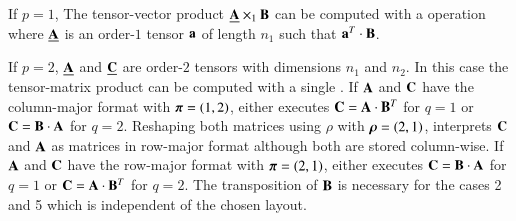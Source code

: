\begin{comment}
\midrule
8 & $>2$ & any & \ $\pi_2,..,\pi_{p-1}$ \ & \tf{gemm(rm)*} & - & $m$ & $n_{\pi_1}$ & $n_q$ & $\mbB$ & $n_q$ & $\mubA$ & $w_{q}$  & $w_{q}$ \\
  & $>2$ & any & \ $\pi_2,..,\pi_{p-1}$ \ & \tf{gemm(cm)*} & - & $n_{\pi_1}$ & $m$ & $n_q$ & $\mubA$ & $w_{q}$ & $\mbB$ & $n_q$ & $w_{q}$ \\
\bottomrule \\
\end{tabular}
\caption%
{%
\footnotesize
Eight cases with \tf{gemv} and \tf{gemm} for the mode-$q$ tensor-matrix multiplication.
Arguments \tf{T}, \tf{M}, \tf{N}, etc. of the BLAS are chosen with respect to the tensor order $p$, layout $\mbpi$ and contraction mode $q$ where \tf{T} specifies if $\mbB$ is transposed.
\tf{gemm*} denotes multiple \tf{gemm} calls with different tensor slices.
Argument $\bar{n}_q$ for case 6 and 7 is given by $\bar{n}_q = 1/n_q \prod_r^p n_r$.
Matrix $\mbB$ has the row-major format.
}
\label{tab:mapping_rm}
\end{table*}
\end{comment}



If $p=1$, The tensor-vector product $\underline{\mathbf{A}} \times_1 \mathbf{B}$ can be computed with a  operation where $\underline{\mathbf{A}}$ is an order-$1$ tensor $\mathbf{a}$ of length $n_1$ such that $\mathbf{a}^T \cdot \mathbf{B}$.

If $p=2$, $\underline{\mathbf{A}}$ and $\underline{\mathbf{C}}$ are order-$2$ tensors with dimensions $n_1$ and $n_2$.
In this case the tensor-matrix product can be computed with a single .
If $\mathbf{A}$ and $\mathbf{C}$ have the column-major format with $\boldsymbol{\pi}=(1,2)$,  either executes $\mathbf{C} = \mathbf{A} \cdot \mathbf{B}^T$ for $q =1$ or $\mathbf{C} = \mathbf{B} \cdot \mathbf{A}$ for $q=2$.
Reshaping both matrices using $\rho$ with $\boldsymbol{\rho} = (2,1)$,  interprets $\mathbf{C}$ and $\mathbf{A}$ as matrices in row-major format although both are stored column-wise.
If $\mathbf{A}$ and $\mathbf{C}$ have the row-major format with $\boldsymbol{\pi}=(2,1)$,  either executes $\mathbf{C} = \mathbf{B} \cdot \mathbf{A}$ for $q =1$ or $\mathbf{C} = \mathbf{A} \cdot \mathbf{B}^T$ for $q=2$. 
The transposition of $\mathbf{B}$ is necessary for the cases 2 and 5 which is independent of the chosen layout.

